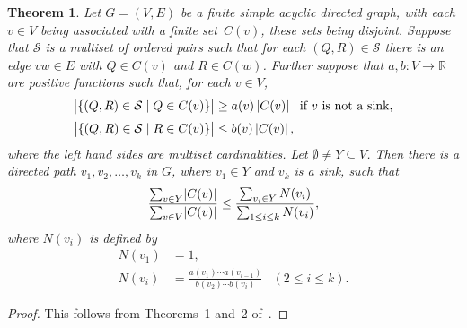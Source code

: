 \documentclass[12pt]{article}
\def\Reals{{\mathbb{R}}}
\newtheorem{theorem}{Theorem}[section]
\numberwithin{equation}{section}
\def\S{{\mathcal{S}}}
\begin{document}
\begin{theorem}\label{t:FM}
Let $G=(V,E)$ be a finite simple acyclic directed graph, with
each $v\in V$ being associated with a finite set~$C(v)$,
these sets being disjoint.
Suppose that $\S$ is a multiset of ordered pairs 
such that for each $(Q,R)\in \S$ there is an edge
$vw\in E$ with $Q\in C(v)$ and $R\in C(w)$. 
Further suppose that
$a,b : V\to\Reals$ are positive functions such
that, for each $v\in V$,
\begin{align}\label{swine}
  \begin{split}
  \Card{\{(Q,R)\in\S \mid Q\in C(v)\}} &\ge a(v)\,\card{C(v)}\,\,\,
   \text{ if $v$ is not a sink,}
  \\[0.5ex]
  \Card{\{(Q,R)\in\S \mid R\in C(v)\}} &\le b(v)\,\card{C(v)}\,,
  \end{split}
\end{align}
where the left hand sides are multiset cardinalities.
Let\/ $\emptyset\ne Y\subseteq V$. Then there is a directed
path $v_1,v_2,\ldots,v_k$ in $G$, where $v_1\in Y$ and
$v_k$ is a sink, such that
\begin{equation}\label{swopt}
  \frac{\sum_{v\in Y}\card{C(v)}}{\sum_{v\in V}\card{C(v)}}
  \le
  \frac{\sum_{v_i\in Y }N(v_i)}
       {\sum_{1\le i\le k}N(v_i)},
\end{equation}
where $N(v_i)$ is defined by
\begin{align*}
       N(v_1) &= 1,\\
       N(v_i) &= \frac{a(v_1)\cdots a(v_{i-1})}
                      {b(v_2)\cdots b(v_i)}& (2\le i\le k).
\end{align*}
\end{theorem}
\begin{proof}
 This follows from Theorems~1 and~2 of~\cite{FM}.
\end{proof}


\medskip
\end{document}
